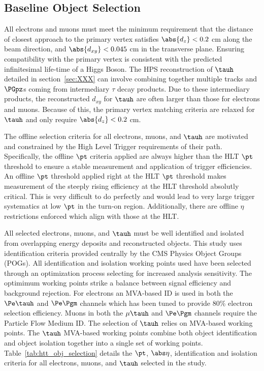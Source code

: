 \subsection{Baseline Object Selection}
All electrons and muons must meet the minimum requirement
that the distance of closest approach to the primary vertex satisfies $\abs{d_z}<0.2$ cm
along the beam direction, and $\abs{d_{xy}}<0.045$ cm in the transverse plane. Ensuring
compatibility with the primary vertex is consistent with the predicted infinitesimal life-time of
a Higgs Boson. The HPS reconstruction of $\tauh$ detailed in section~\ref{sec:XXX} can involve
combining together multiple tracks and $\PGpz$s coming from intermediary $\tau$ decay products.
Due to these intermediary products, the reconstructed $d_{xy}$ for $\tauh$ are often
larger than those for electrons and muons. Because of this, the primary vertex matching
criteria are relaxed for $\tauh$ and only require $\abs{d_z}<0.2$ cm.

The offline selection criteria for all electrons, muons, and $\tauh$ are motivated and constrained
by the High Level Trigger requirements of their path. Specifically, the offline $\pt$ criteria
applied are always higher than the HLT $\pt$ threshold to ensure a stable measurement and application
of trigger efficiencies. An offline $\pt$ threshold applied right at the HLT $\pt$ threshold
makes measurement of the steeply rising efficiency at the HLT threshold absolutly critical.
This is very difficult to do perfectly and would lead to very large trigger systematics
at low $\pt$ in the turn-on region. Additionally, there are offline $\eta$ restrictions
enforced which align with those at the HLT.

All selected electrons, muons, and $\tauh$ must be well identified and isolated from overlapping
energy deposits and reconstructed objects. This study uses identification criteria
provided centrally by the CMS Physics Object Groups (POGs). All identification and isolation
working points used have been selected through an optimization process selecting
for increased analysis sensitivity. The optimimum working points strike a balance
between signal efficiency and background rejection. For electrons an MVA-based ID
is used in both the $\Pe\tauh$ and $\Pe\Pgm$ channels which has been tuned to provide 
80\% electron selection efficiency. Muons in both the $\mu\tauh$ and $\Pe\Pgm$ channels
require the Particle Flow Medium ID. The selection of $\tauh$ relies on MVA-based working
points. The $\tauh$ MVA-based working points combine both object identification and object
isolation together into a single set of working points. Table~\ref{tab:htt_obj_selection}
details the $\pt$, $\abs\eta$, identification and isolation criteria for all electrons, muons,
and $\tauh$ selected in the study.


